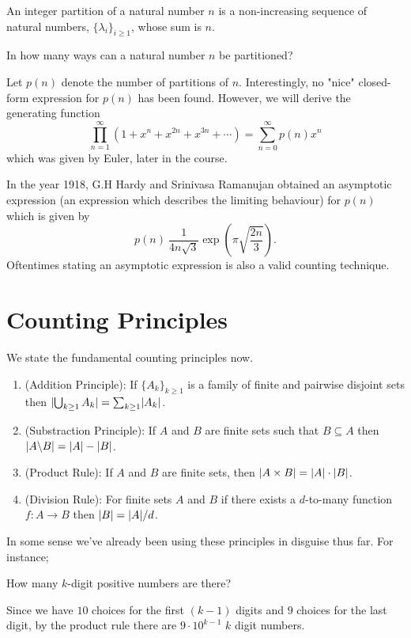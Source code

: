 \begin{definition}
An integer partition of a natural number $n$ is a non-increasing sequence of natural numbers, $\{\lambda_i\}_{i \ge 1}$, whose sum is $n$.
\end{definition}

\begin{question}
In how many ways can a natural number $n$ be partitioned?
\end{question}

Let $p(n)$ denote the number of partitions of $n$. Interestingly, no "nice" closed-form expression for $p(n)$ has been found. However, we will derive the generating function \[
	\prod_{n=1}^\infty\left( 1+x^n +x^{2n}+x^{3n}+\cdots\right) =  \sum_{n=0}^{\infty}p\left( n \right) x^n
\] which was given by Euler, later in the course.

\begin{remark}
	In the year 1918, G.H Hardy and Srinivasa Ramanujan obtained an asymptotic expression (an expression which describes the limiting behaviour) for $p\left( n \right)$ which is given by \[
	p\left( n \right) ~ \frac{1}{4n\sqrt{3}}\exp\left( \pi \sqrt{\frac{2n}{3}}  \right) 
	.\] Oftentimes stating an asymptotic expression is also a valid counting technique.
\end{remark}

\section{Counting Principles}
We state the fundamental counting principles now.
\begin{enumerate}
\item (Addition Principle): If $\{A_{k}\}_{k\geq 1}$ is a family of finite and pairwise disjoint sets then $\lvert\bigcup_{k\geq 1} A_{k}\rvert = \sum_{k\geq 1}\lvert A_{k}\rvert$.
\item (Substraction Principle): If $A$ and $B$ are finite sets such that $B\subseteq A$ then $\lvert A\backslash B\rvert = \lvert A\rvert-\lvert B\rvert$.
\item (Product Rule): If $A$ and $B$ are finite sets, then $\lvert A\times B\rvert = \lvert A\rvert\cdot\lvert B\rvert$.
\item (Division Rule): For finite sets $A$ and $B$ if there exists a $d$-to-many function $f:A\to B$ then $\lvert B\rvert=\lvert A\rvert/d$.
\end{enumerate}
In some sense we've already been using these principles in disguise thus far. For instance;

\begin{question}
	How many $k$-digit positive numbers are there?
\end{question}
Since we have $10$ choices for the first $\left(k-1\right)$ digits and $9$ choices for the last digit, by the product rule there are $9\cdot 10^{k-1}$ $k$ digit numbers.

